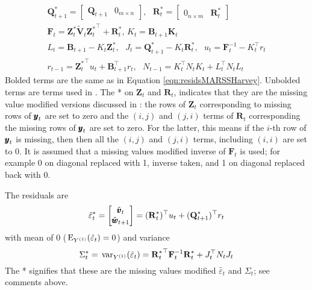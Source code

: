 \documentclass[]{article}
\def\UPS{\mbox{\boldmath $\Upsilon$}}
\def\XI{\mbox{\boldmath $\Xi$}}
\def\BB{\mbox{$\mathbf B$}}	\def\bb{\mbox{$\mathbf b$}} \def\Bb{\mbox{$\mathbf J$}} \def\Ba{\mbox{$\mathbf L$}} \def\Bm{\UPS}
\def\E{\,\textup{\textrm{E}}}
\def\FF{\mbox{$\mathbf F$}} \def\ff{\mbox{$\mathbf f$}}
\def\KK{\mbox{$\mathbf K$}}
\def\QQ{\mbox{$\mathbf Q$}}	 \def\qq{\mbox{$\mathbf q$}} \def\Qb{\mbox{$\mathbf G$}}  \def\Qm{\mathbb{Q}}
\def\RR{\mbox{$\mathbf R$}}	 \def\rr{\mbox{$\mathbf r$}} \def\Rb{\mbox{$\mathbf H$}}	\def\Rm{\mathbb{R}}
\def\VV{\mbox{$\pmb{V}$}}	\def\vv{\mbox{$\pmb{v}$}}
\def\ZZ{\mbox{$\mathbf Z$}}	\def\zz{\mbox{$\mathbf z$}}	\def\Zb{\mbox{$\mathbf M$}} \def\Za{\mbox{$\mathbf N$}} \def\Zm{\XI}
\def\var{\,\textup{\textrm{var}}}
\def\hatVt{\widetilde{\VV}_t}
\begin{document}
\begin{equation}\label{eqn:Harveyalgo}
\begin{gathered}
\QQ^*_{t+1}=\begin{bmatrix}\QQ_{t+1}&0_{m \times n}\end{bmatrix}, \mbox{    } \RR^*_t=\begin{bmatrix}0_{n \times m}&\RR_t^*\end{bmatrix}\\
\FF_t = \ZZ_t^*\hatVt{\ZZ_t^*}^\top+\RR_t^*\mbox{,   } K_t = \BB_{t+1}\KK_t\\
L_t = \BB_{t+1} - K_t\ZZ_t^*, \mbox{    } J_t= \QQ^*_{t+1} - K_t \RR^*_t, \mbox{    } u_t = \FF_t^{-1} - K_t^\top r_t\\
r_{t-1} = {\ZZ_t^*}^\top u_t + \BB_{t+1}^\top r_t, \mbox{    } N_{t-1} = K_t^\top N_t K_t + L_t^\top N_t L_t
\end{gathered}
\end{equation}
Bolded terms are the same as in Equation \ref{eqn:residsMARSSHarvey}.  Unbolded terms are terms used in \citet{Harveyetal1998}.  The * on $\ZZ_t$ and $\RR_t$, indicates that they are the missing value modified versions  discussed in \citet[section 6.4]{ShumwayStoffer2006}: the rows of $\ZZ_t$ corresponding to missing rows of $\mbox{$\pmb{y}$}_t$ are set to zero and the $(i,j)$ and $(j,i)$ terms of $\RR_t$ corresponding the missing rows of $\mbox{$\pmb{y}$}_t$ are set to zero.  For the latter, this means if the $i$-th row of $\mbox{$\pmb{y}$}_t$ is missing, then then all the $(i,j)$ and $(j,i)$ terms, including $(i,i)$ are set to 0. It is assumed that a missing values modified inverse of $\FF_t$ is used; for example 0 on diagonal replaced with 1, inverse taken, and 1 on diagonal replaced back with 0.

The residuals are
\begin{equation}\label{eqn:Harveyresiduals}
\hat{\varepsilon}^*_t = \begin{bmatrix}\hat{\vv}_t\\ \hat{\ww}_{t+1}\end{bmatrix} =({\RR^*_t})^\top u_t + ({\QQ^*_{t+1}})^\top r_t
\end{equation}
with mean of 0 ($\E_{Y^{(1)}}(\hat{\varepsilon}_t)=0$) and variance
\begin{equation}\label{eqn:Harveyvariance}
\Sigma_t^* = \var_{Y^{(1)}}(\hat{\varepsilon}_t) ={\RR^*_t}^\top \FF_t^{-1} \RR^*_t + J_t^\top N_t J_t
\end{equation}
The * signifies that these are the missing values modified $\hat{\varepsilon}_t$ and $\Sigma_t$; see comments above.
\end{document}
